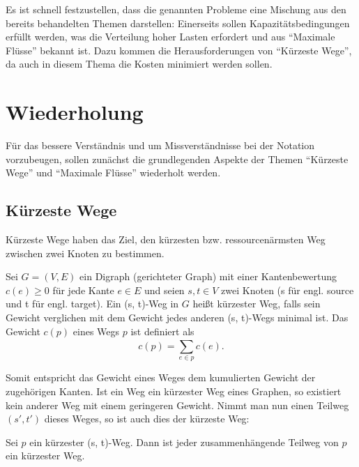Es ist schnell festzustellen, dass die genannten Probleme eine Mischung aus den bereits behandelten Themen darstellen: Einerseits sollen Kapazitätsbedingungen erfüllt werden, was die Verteilung hoher Lasten erfordert und aus \enquote{Maximale Flüsse} bekannt ist. Dazu kommen die Herausforderungen von \enquote{Kürzeste Wege}, da auch in diesem Thema die Kosten minimiert werden sollen.


\newpage

\section{Wiederholung}

Für das bessere Verständnis und um Missverständnisse bei der Notation vorzubeugen, sollen zunächst die grundlegenden Aspekte der Themen \enquote{Kürzeste Wege} und \enquote{Maximale Flüsse} wiederholt werden. 

\subsection{Kürzeste Wege}

Kürzeste Wege haben das Ziel, den kürzesten bzw. ressourcenärmsten Weg zwischen zwei Knoten zu bestimmen.

\begin{definition}
    Sei $G = (V,E)$ ein Digraph (gerichteter Graph) mit einer Kantenbewertung $c(e) \geq 0$ für jede Kante $e \in E$ und seien $s, t \in V$ zwei Knoten (s für engl. source und t für engl. target). Ein (s, t)-Weg in $G$ heißt kürzester Weg, falls sein Gewicht verglichen mit dem Gewicht jedes anderen (s, t)-Wegs minimal ist. Das Gewicht $c(p)$ eines Wegs $p$ ist definiert als
    \begin{equation}
        c(p) = \displaystyle\sum_{e \in p}^{} c(e).
    \end{equation}
\end{definition}

Somit entspricht das Gewicht eines Weges dem kumulierten Gewicht der zugehörigen Kanten. Ist ein Weg ein kürzester Weg eines Graphen, so existiert kein anderer Weg mit einem geringeren Gewicht. Nimmt man nun einen Teilweg $(s', t')$ dieses Weges, so ist auch dies der kürzeste Weg:
\begin{lemma}
Sei $p$ ein kürzester (s, t)-Weg. Dann ist jeder zusammenhängende Teilweg von $p$ ein kürzester Weg.
\end{lemma}

